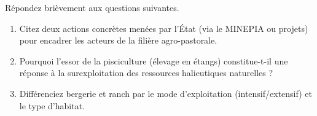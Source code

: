 \documentclass[11pt]{article}
\begin{document}
\begin{exercice}
Répondez brièvement aux questions suivantes.
\begin{enumerate}
    \item Citez deux actions concrètes menées par l'État (via le MINEPIA ou projets) pour encadrer les acteurs de la filière agro-pastorale.
    \item Pourquoi l'essor de la pisciculture (élevage en étangs) constitue-t-il une réponse à la surexploitation des ressources halieutiques naturelles ?
    \item Différenciez \og bergerie \fg{} et \og ranch \fg{} par le mode d'exploitation (intensif/extensif) et le type d'habitat.
\end{enumerate}
\end{exercice}
\end{document}
